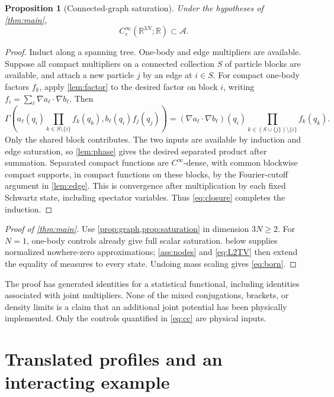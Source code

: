 \documentclass[11pt]{article}
\numberwithin{equation}{section}
\newtheorem{proposition}[proposition]{Proposition}
\theoremstyle{definition}
\newcommand{\R}{\mathbb R}
\newcommand{\Cc}{C_c^\infty}
\newcommand{\Acal}{\mathcal A}
\begin{document}
\begin{proposition}[Connected-graph saturation]\label{prop:graph}
Under the hypotheses of \cref{thm:main},
\[
 \Cc(\R^{3N};\R)\subset\Acal.
\]
\end{proposition}

\begin{proof}
Induct along a spanning tree. One-body and edge multipliers are available. Suppose all compact multipliers on a connected collection \(S\) of particle blocks are available, and attach a new particle \(j\) by an edge at \(i\in S\). For compact one-body factors \(f_k\), apply \cref{lem:factor} to the desired factor on block \(i\), writing \(f_i=\sum_\ell\nabla a_\ell\cdot\nabla b_\ell\). Then
\[
 \Gamma\left(a_\ell(q_i)\!\!\prod_{k\in S\setminus\{i\}}\!\!f_k(q_k),
                 b_\ell(q_i)f_j(q_j)\right)
 =(\nabla a_\ell\cdot\nabla b_\ell)(q_i)
                  \prod_{k\in(S\cup\{j\})\setminus\{i\}}f_k(q_k).
\]
Only the shared block contributes. The two inputs are available by induction and edge saturation, so \cref{lem:phase} gives the desired separated product after summation. Separated compact functions are \(C^\infty\)-dense, with common blockwise compact supports, in compact functions on these blocks, by the Fourier-cutoff argument in \cref{lem:edge}. This is convergence after multiplication by each fixed Schwartz state, including spectator variables. Thus \eqref{eq:closure} completes the induction.
\end{proof}

\begin{proof}[Proof of \cref{thm:main}]
Use \cref{prop:graph,prop:saturation} in dimension \(3N\ge2\). For \(N=1\), one-body controls already give full scalar saturation.  below supplies normalized nowhere-zero approximations; \ref{ass:nodes} and \eqref{eq:L2TV} then extend the equality of measures to every state. Undoing mass scaling gives \eqref{eq:born}.
\end{proof}

The proof has generated identities for a statistical functional, including identities associated with joint multipliers. None of the mixed conjugations, brackets, or density limits is a claim that an additional joint potential has been physically implemented. Only the controls quantified in \eqref{eq:cc} are physical inputs.

\section{Translated profiles and an interacting example}\label{sec:profiles}
\end{document}
